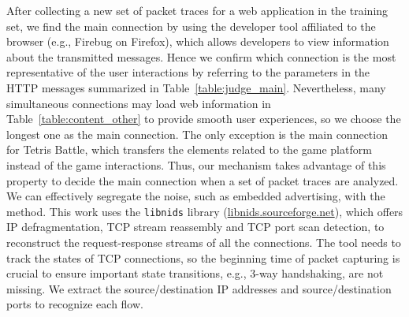 After collecting a new set of packet traces for a web application in the training set, we find the main connection by using the developer tool affiliated to the browser (e.g., Firebug on Firefox), which allows developers to view information about the transmitted messages. Hence we confirm which connection is the most representative of the user interactions by referring to the parameters in the HTTP messages summarized in Table~\ref{table:judge_main}. Nevertheless, many simultaneous connections may load web information in Table~\ref{table:content_other} to provide smooth user experiences, so we choose the longest one as the main connection. The only exception is the main connection for Tetris Battle, which transfers the elements related to the game platform instead of the game interactions. Thus, our mechanism takes advantage of this property to decide the main connection when a set of packet traces are analyzed. We can effectively segregate the noise, such as embedded advertising, with the method. This work uses the \texttt{libnids} library (\url{libnids.sourceforge.net}), which offers IP defragmentation, TCP stream reassembly and TCP port scan detection, to reconstruct the request-response streams of all the connections. The tool needs to track the states of TCP connections, so the beginning time of packet capturing is crucial to ensure important state transitions, e.g., 3-way handshaking, are not missing. We extract the source/destination IP addresses and source/destination ports to recognize each flow.




